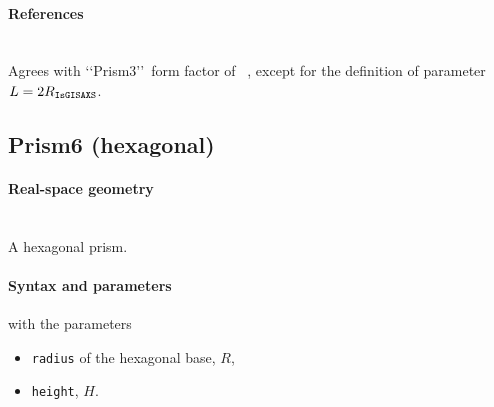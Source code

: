 \paragraph{References}\strut\\
Agrees with \lq\lq Prism3\rq\rq\ form factor of \IsGISAXS~\cite{Laz02},
except for the definition of parameter $L= 2 R_{\rm{\texttt{IsGISAXS}}}$.

\clearpage
\subsection{Prism6 (hexagonal)} \label{sec:Prism6}

\paragraph{Real-space geometry}\strut\\
A hexagonal prism.

\begin{figure}[h]
\hfill
{}
\hfill
{}
\hfill
\end{figure}

\FloatBarrier

\paragraph{Syntax and parameters}
\begin{quote}
\end{quote}
with the parameters
\begin{itemize}
\item \texttt{radius} of the hexagonal base, $R$,
\item \texttt{height}, $H$.
\end{itemize}

